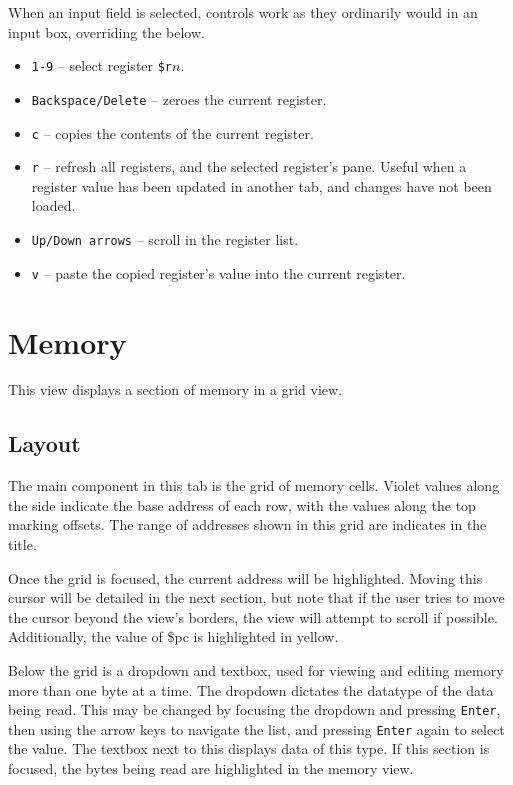 \documentclass[10pt]{article}
\begin{document}
    When an input field is selected, controls work as they ordinarily would in an input box, overriding the below.

    \begin{itemize}
        \item \texttt{1-9} -- select register \texttt{\$r\(n\)}.
        \item \texttt{Backspace/Delete} -- zeroes the current register.
        \item \texttt{c} -- copies the contents of the current register.
        \item \texttt{r} -- refresh all registers, and the selected register's pane.
        Useful when a register value has been updated in another tab, and changes have not been loaded.
        \item \texttt{Up/Down arrows} -- scroll in the register list.
        \item \texttt{v} -- paste the copied register's value into the current register.
    \end{itemize}

    \section{Memory}

    This view displays a section of memory in a grid view.

    \subsection{Layout}

    The main component in this tab is the grid of memory cells.
    Violet values along the side indicate the base address of each row, with the values along the top marking offsets.
    The range of addresses shown in this grid are indicates in the title.

    Once the grid is focused, the current address will be highlighted.
    Moving this cursor will be detailed in the next section, but note that if the user tries to move the cursor beyond the view's borders, the view will attempt to scroll if possible.
    Additionally, the value of \$pc is highlighted in yellow.

    Below the grid is a dropdown and textbox, used for viewing and editing memory more than one byte at a time.
    The dropdown dictates the datatype of the data being read.
    This may be changed by focusing the dropdown and pressing \texttt{Enter}, then using the arrow keys to navigate the list, and pressing \texttt{Enter} again to select the value.
    The textbox next to this displays data of this type.
    If this section is focused, the bytes being read are highlighted in the memory view.
\end{document}
